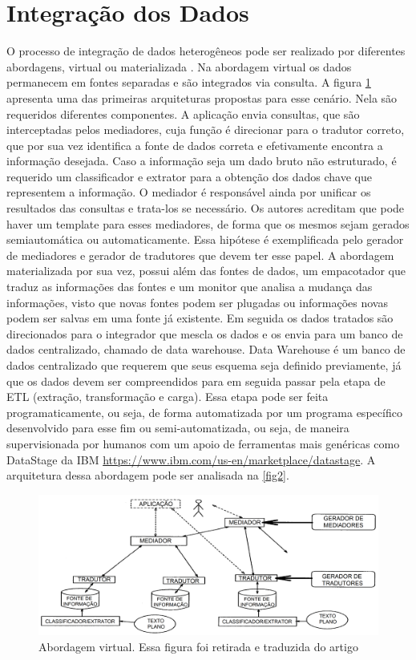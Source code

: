 \section{Integração dos Dados}
O processo de integração de dados heterogêneos pode ser realizado por diferentes abordagens, virtual \cite{chawathe1994tsimmis} ou materializada \cite{Widom:1995:RPD:221270.221319}.
Na abordagem virtual os dados permanecem em fontes separadas e são integrados via consulta. A figura \ref{fig1} apresenta uma das primeiras arquiteturas propostas para esse cenário. Nela são requeridos diferentes componentes. A aplicação envia consultas, que são interceptadas pelos mediadores, cuja função é direcionar para o tradutor correto, que por sua vez identifica a fonte de dados correta e efetivamente encontra a informação desejada. Caso a informação seja um dado bruto não estruturado, é requerido um classificador e extrator para a obtenção dos dados chave que representem a informação. O mediador é responsável ainda por unificar os resultados das consultas e trata-los se necessário. Os autores acreditam que pode haver um template para esses mediadores, de forma que os mesmos sejam gerados semiautomática ou automaticamente. Essa hipótese é exemplificada pelo gerador de mediadores e gerador de tradutores que devem ter esse papel.
A abordagem materializada por sua vez, possui além das fontes de dados, um empacotador que traduz as informações das fontes e um monitor que analisa a mudança das informações, visto que novas fontes podem ser plugadas ou informações novas podem ser salvas em uma fonte já existente. Em seguida os dados tratados são direcionados para o integrador que mescla os dados e os envia para um banco de dados centralizado, chamado de  data warehouse. Data Warehouse é um banco de dados centralizado que requerem que seus esquema seja definido previamente, já que os dados devem ser compreendidos para em seguida passar pela etapa de ETL (extração, transformação e carga). Essa etapa pode ser feita programaticamente, ou seja, de forma automatizada por um programa específico desenvolvido para esse fim ou semi-automatizada, ou seja, de maneira supervisionada por humanos com um apoio de ferramentas mais genéricas como DataStage da IBM \url{https://www.ibm.com/us-en/marketplace/datastage}. A arquitetura dessa abordagem pode ser analisada na \ref{fig2}.

\begin{figure}[!ht]
\centering
\includegraphics[width=0.3\linewidth]{figuras/TSIMMIS.png}
\caption{Abordagem virtual. Essa figura foi retirada e traduzida do artigo \cite{chawathe1994tsimmis}}
\label{fig1}
\end{figure}

